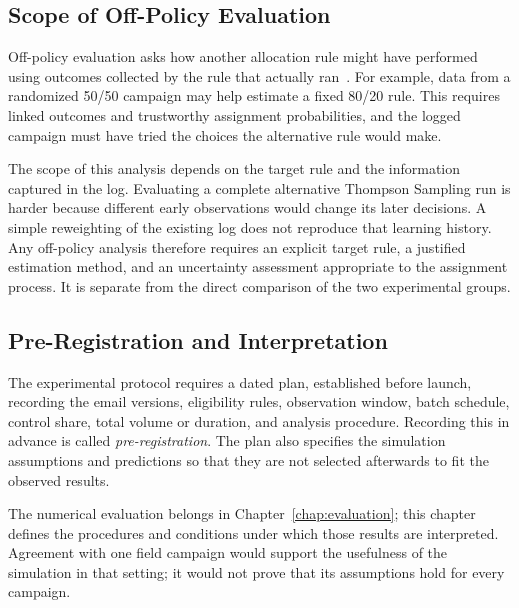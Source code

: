 \subsection{Scope of Off-Policy Evaluation}

Off-policy evaluation asks how another allocation rule might have performed using outcomes collected by the rule that actually ran~\cite{dudik2011doubly,li2011unbiased}. For example, data from a randomized 50/50 campaign may help estimate a fixed 80/20 rule. This requires linked outcomes and trustworthy assignment probabilities, and the logged campaign must have tried the choices the alternative rule would make.

The scope of this analysis depends on the target rule and the information captured in the log. Evaluating a complete alternative Thompson Sampling run is harder because different early observations would change its later decisions. A simple reweighting of the existing log does not reproduce that learning history. Any off-policy analysis therefore requires an explicit target rule, a justified estimation method, and an uncertainty assessment appropriate to the assignment process. It is separate from the direct comparison of the two experimental groups.

\subsection{Pre-Registration and Interpretation}

The experimental protocol requires a dated plan, established before launch, recording the email versions, eligibility rules, observation window, batch schedule, control share, total volume or duration, and analysis procedure. Recording this in advance is called \emph{pre-registration}. The plan also specifies the simulation assumptions and predictions so that they are not selected afterwards to fit the observed results.

The numerical evaluation belongs in Chapter~\ref{chap:evaluation}; this chapter defines the procedures and conditions under which those results are interpreted. Agreement with one field campaign would support the usefulness of the simulation in that setting; it would not prove that its assumptions hold for every campaign.
